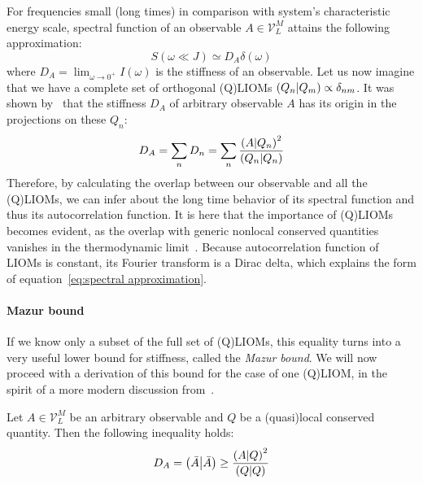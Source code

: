 For frequencies small (long times) in comparison with system's characteristic energy
scale, spectral function of an observable \(A \in \mathcal{V}_L^M\) attains the following approximation:
\begin{equation}
  S(\omega \ll  J) \simeq  D_{A} \delta(\omega)
  \label{eq:spectral approximation}
\end{equation}
where \(D_A = \lim_{\omega\to 0^+} I(\omega)\) is the stiffness of an observable.
Let us now imagine that we have a complete set of orthogonal (Q)LIOMs 
\(\left(Q_{n} \middle| Q_{m}\right) \propto \delta_{nm}\). It was shown 
by~\textcite{Mazur1969,Suzuki1971} that the stiffness \(D_{A}\) of arbitrary observable \(A\) has its origin
in the projections on these \(Q_{n}\):
\begin{equation}
  D_A = \sum_{n} D_{n} = \sum_{n} \frac{\left(A \middle| Q_{n}\right)^2}
  {\left(Q_{n} \middle| Q_{n}\right)}
  \label{eq:mazur equality}
\end{equation}
Therefore, by calculating the overlap between our observable and all the (Q)LIOMs, we can infer about the long time
behavior of its spectral function and thus its autocorrelation function. It is here that the
importance of (Q)LIOMs becomes evident, as the overlap with generic nonlocal conserved quantities
vanishes in the thermodynamic limit~\autocite{Zotos1997}.
Because autocorrelation function of
LIOMs is constant, its Fourier transform is a Dirac delta, which explains the form of 
equation~\eqref{eq:spectral approximation}. 

\paragraph{Mazur bound} If we know only a subset of the full set of (Q)LIOMs, this equality turns into 
a very useful lower bound for stiffness, called the \textit{Mazur bound}. We will now proceed with a derivation
of this bound for the case of one (Q)LIOM, in the spirit of a more modern discussion from~\textcite{Ilievski2016a}.
\begin{proposition}
  Let \(A\in \mathcal{V}_L^M\) be an arbitrary observable and \(Q\) be a (quasi)local conserved quantity. Then the following inequality
  holds:
  \begin{equation*}
    D_{A} = \left(\bar{A} \middle| \bar{A}\right) \geq \frac{\left(A \middle| Q\right)^2}{\left(Q \middle| Q\right)}
  \end{equation*}
  \label{prop:single mazur}
\end{proposition}

